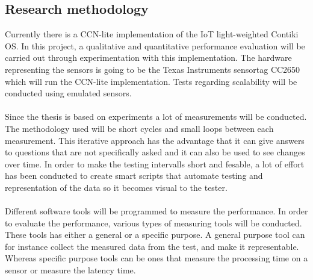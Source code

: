 \subsection{Research methodology}
Currently there is a CCN-lite implementation of the IoT light-weighted Contiki OS. In this project, a qualitative and quantitative performance evaluation will be carried out through experimentation with this implementation. The hardware representing the sensors is going to be the Texas Instruments sensortag CC2650 which will run the CCN-lite implementation. Tests regarding scalability will be conducted using emulated sensors.
\\\\
Since the thesis is based on experiments a lot of measurements will be conducted. The methodology used will be short cycles and small loops between each measurement. This iterative approach has the advantage that it can give answers to questions that are not specifically asked and it can also be used to see changes over time. 
In order to make the testing intervalls short and fesable, a lot of effort has been conducted to create smart scripts that automate testing and representation of the data so it becomes visual to the tester. 
\\\\
Different software tools will be programmed to measure the performance. 
In order to evaluate the performance, various types of measuring tools will be conducted. These tools has either a general or a specific purpose. A general purpose tool can for instance collect the measured data from the test, and make it representable. Whereas specific purpose tools can be ones that measure the processing time on a sensor or measure the latency time. 

